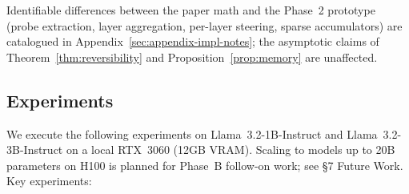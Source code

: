 \documentclass{article}
\begin{document}
Identifiable differences between the paper math and the Phase~2 prototype (probe extraction, layer aggregation, per-layer steering, sparse accumulators) are catalogued in Appendix~\ref{sec:appendix-impl-notes}; the asymptotic claims of Theorem~\ref{thm:reversibility} and Proposition~\ref{prop:memory} are unaffected.


\subsection{Experiments}

We execute the following experiments on Llama~3.2-1B-Instruct and Llama~3.2-3B-Instruct on a local RTX~3060 (12GB VRAM). Scaling to models up to 20B parameters on H100 is planned for Phase~B follow-on work; see §7 Future Work. Key experiments:

\end{document}
